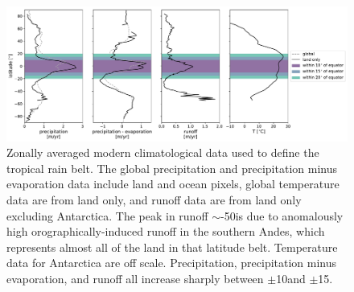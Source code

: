 \begin{figure}[h!]
\begin{center}
	\includegraphics[width=\textwidth]{figures/LIPs/climatology.pdf}
	\caption[Zonally averaged modern climatological data used to define the tropical rain belt.]{Zonally averaged modern climatological data used to define the tropical rain belt. The global precipitation \citep{Kalnay1996a} and precipitation minus evaporation \citep{Trenberth2011a} data include land and ocean pixels, global temperature data \citep{Kalnay1996a} are from land only, and runoff data \citep{Fekete1999a} are from land only excluding Antarctica. The peak in runoff $\sim$-50\degrees is due to anomalously high orographically-induced runoff in the southern Andes, which represents almost all of the land in that latitude belt. Temperature data for Antarctica are off scale. Precipitation, precipitation minus evaporation, and runoff all increase sharply between $\pm$10\degrees and $\pm$15\degrees.}
	\label{fig:climatology}
\end{center}
\end{figure}

